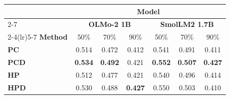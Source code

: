 \begin{table}[t!]
\centering
\small
\setlength{\tabcolsep}{3pt}
\begin{tabular}{lccc|ccc}
\toprule
& \multicolumn{6}{c}{\textbf{Model}} \\
\cmidrule(lr){2-7}
& \multicolumn{3}{c|}{\textbf{OLMo-2 1B}} & \multicolumn{3}{c}{\textbf{SmolLM2 1.7B}} \\
\cmidrule(lr){2-4}\cmidrule(lr){5-7}
\textbf{Method} & 50\% & 70\% & 90\% & 50\% & 70\% & 90\% \\
\midrule
\textbf{PC} & 0.514 & 0.472 & 0.412 & 0.541 & 0.491 & 0.411 \\
\textbf{PCD} & \textbf{0.534} & \textbf{0.492} & 0.421 & \textbf{0.552} & \textbf{0.507} & \textbf{0.427} \\
\textbf{HP} & 0.512 & 0.477 & 0.421 & 0.540 & 0.496 & 0.414 \\
\textbf{HPD} & 0.530 & 0.488 & \textbf{0.427} & 0.550 & 0.503 & 0.410 \\
\bottomrule
\end{tabular}
\end{table}
